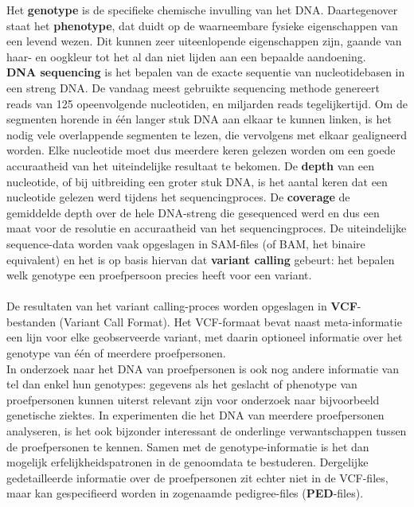Het \textbf{genotype} is de specifieke chemische invulling van het DNA. Daartegenover staat het \textbf{phenotype}, dat duidt op de waarneembare fysieke eigenschappen van een levend wezen. Dit kunnen zeer uiteenlopende eigenschappen zijn, gaande van haar- en oogkleur tot het al dan niet lijden aan een bepaalde aandoening.\\

\textbf{DNA sequencing} is het bepalen van de exacte sequentie van nucleotidebasen in een streng DNA. De vandaag meest gebruikte sequencing methode genereert reads van 125 opeenvolgende nucleotiden, en miljarden reads tegelijkertijd. Om de segmenten horende in \'e\'en langer stuk DNA aan elkaar te kunnen linken, is het nodig vele overlappende segmenten te lezen, die vervolgens met elkaar gealigneerd worden. Elke nucleotide moet dus meerdere keren gelezen worden om een goede accuraatheid van het uiteindelijke resultaat te bekomen. De \textbf{depth} van een nucleotide, of bij uitbreiding een groter stuk DNA, is het aantal keren dat een nucleotide gelezen werd tijdens het sequencingproces. De \textbf{coverage} de gemiddelde depth over de hele DNA-streng die gesequenced werd en dus een maat voor de resolutie en accuraatheid van het sequencingproces. De uiteindelijke sequence-data worden vaak opgeslagen in SAM-files (of BAM, het binaire equivalent) en het is op basis hiervan dat \textbf{variant calling} gebeurt: het bepalen welk genotype een proefpersoon precies heeft voor een variant.\\\\
De resultaten van het variant calling-proces worden opgeslagen in \textbf{VCF}-bestanden (Variant Call Format). Het VCF-formaat bevat naast meta-informatie een lijn voor elke geobserveerde variant, met daarin optioneel informatie over het genotype van \'e\'en of meerdere proefpersonen.\\
In onderzoek naar het DNA van proefpersonen is ook nog andere informatie van tel dan enkel hun genotypes: gegevens als het geslacht of phenotype van proefpersonen kunnen uiterst relevant zijn voor onderzoek naar bijvoorbeeld genetische ziektes. In experimenten die het DNA van meerdere proefpersonen analyseren, is het ook bijzonder interessant de onderlinge verwantschappen tussen de proefpersonen te kennen. Samen met de genotype-informatie is het dan mogelijk erfelijkheidspatronen in de genoomdata te bestuderen. Dergelijke gedetailleerde informatie over de proefpersonen zit echter niet in de VCF-files, maar kan gespecifieerd worden in zogenaamde pedigree-files (\textbf{PED}-files). 